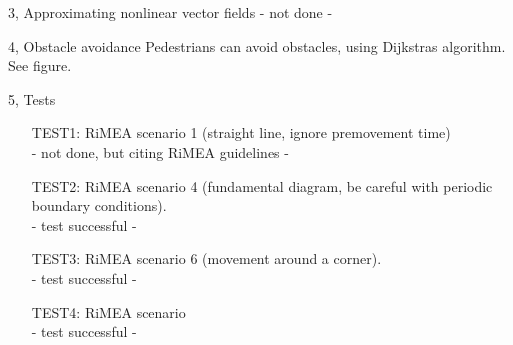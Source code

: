 \documentclass[10pt,a4paper]{article}
\begin{document}
\begin{task}{3, Approximating nonlinear vector fields}
- not done -
\end{task}
\begin{task}{4, Obstacle avoidance}
Pedestrians can avoid obstacles, using Dijkstras algorithm. See figure.
\end{task}
\begin{task}{5, Tests}
\begin{enumerate}
\item[TEST1:] RiMEA scenario 1 (straight line, ignore premovement time)\\
- not done, but citing RiMEA guidelines -
\item[TEST2:] RiMEA scenario 4 (fundamental diagram, be careful with periodic boundary conditions).\\
- test successful - 
\item[TEST3:] RiMEA scenario 6 (movement around a corner).\\
- test successful - 
\item[TEST4:] RiMEA scenario\\
- test successful - 
\end{enumerate}
\end{task}
\end{document}
